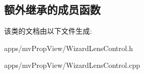 \subsection*{额外继承的成员函数}


该类的文档由以下文件生成\+:\begin{DoxyCompactItemize}
\item 
apps/mv\+Prop\+View/Wizard\+Lens\+Control.\+h\item 
apps/mv\+Prop\+View/Wizard\+Lens\+Control.\+cpp\end{DoxyCompactItemize}
